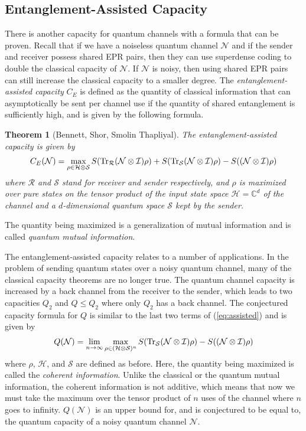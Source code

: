 \documentclass[a4paper, 12pt]{article}
\numberwithin{equation}{section}
\numberwithin{figure}{section}
\newtheorem{theorem}{Theorem}[section]
\theoremstyle{definition}
\begin{document}
    \subsection{Entanglement-Assisted Capacity}
    There is another capacity for quantum channels with a formula that can be proven. Recall that if we have a noiseless quantum channel $\mathcal{N}$ and if the sender and receiver possess shared EPR pairs, then they can use superdense coding to double the classical capacity of $\mathcal{N}$. If $\mathcal{N}$ is noisy, then using shared EPR pairs can still increase the classical capacity to a smaller degree. The \textit{entanglement-assisted capacity} $C_E$ is defined as the quantity of classical information that can asymptotically be sent per channel use if the quantity of shared entanglement is sufficiently high, and is given by the following formula. \cite{shor}
    \begin{theorem}[Bennett, Shor, Smolin Thapliyal]
        The entanglement-assisted capacity is given by
        \begin{align}
            C_E(\mathcal{N}) = \max_{\rho \in \mathcal{H} \otimes \mathcal{S}} S(\textnormal{Tr}_\mathcal{R}(\mathcal{N} \otimes \mathcal{I}) \rho) + S(\textnormal{Tr}_\mathcal{S}(\mathcal{N} \otimes \mathcal{I}) \rho) - S((\mathcal{N} \otimes \mathcal{I}) \rho) \label{eq:assisted}
        \end{align}
        where $\mathcal{R}$ and $\mathcal{S}$ stand for receiver and sender respectively, and $\rho$ is maximized over pure states on the tensor product of the input state space $\mathcal{H} = \mathbb{C}^d$ of the channel and a $d$-dimensional quantum space $\mathcal{S}$ kept by the sender.
    \end{theorem}
    The quantity being maximized is a generalization of mutual information and is called \textit{quantum mutual information}. \par
    The entanglement-assisted capacity relates to a number of applications. In the problem of sending quantum states over a noisy quantum channel, many of the classical capacity theorems are no longer true. The quantum channel capacity is increased by a back channel from the receiver to the sender, which leads to two capacities $Q_2$ and $Q \leq Q_2$ where only $Q_2$ has a back channel. The conjectured capacity formula for $Q$ is similar to the last two terms of (\ref{eq:assisted}) and is given by
    \begin{align}
        Q(\mathcal{N}) = \lim_{n \to \infty} \max_{\rho \in (\mathcal{H} \otimes \mathcal{S})^n} S(\textnormal{Tr}_\mathcal{S}(\mathcal{N} \otimes \mathcal{I}) \rho) - S((\mathcal{N} \otimes \mathcal{I}) \rho)
    \end{align}
    where $\rho$, $\mathcal{H}$, and $\mathcal{S}$ are defined as before. Here, the quantity being maximized is called the \textit{coherent information}. Unlike the classical or the quantum mutual information, the coherent information is not additive, which means that now we must take the maximum over the tensor product of $n$ uses of the channel where $n$ goes to infinity. $Q(\mathcal{N})$ is an upper bound for, and is conjectured to be equal to, the quantum capacity of a noisy quantum channel $\mathcal{N}$.
\end{document}
